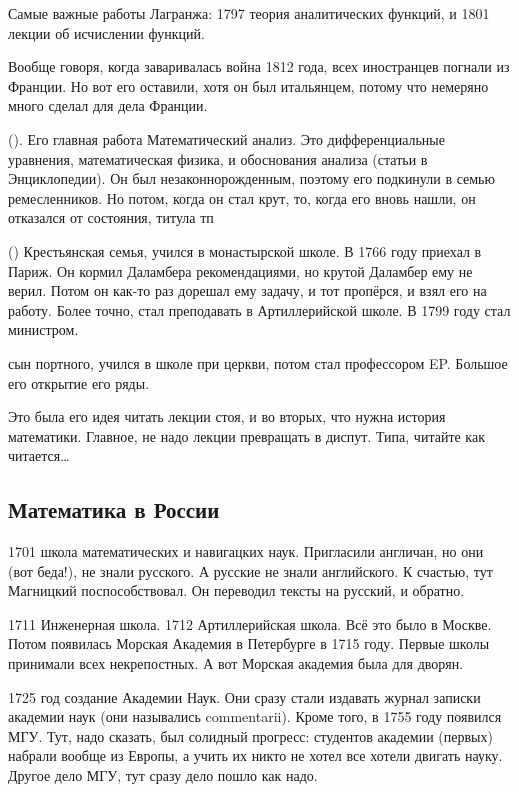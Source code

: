 \documentclass[a4paper,oneside,fleqn,10pt]{article}
\begin{document}
Самые важные работы Лагранжа: 1797 теория аналитических функций, и 1801 лекции об исчислении функций.

Вообще говоря, когда заваривалась война 1812 года, всех иностранцев погнали из Франции.
Но вот его оставили, хотя он был итальянцем, потому что немеряно много сделал для дела Франции.

 (). Его главная работа Математический анализ.
Это дифференциальные уравнения, математическая физика, и обоснования анализа (статьи в Энциклопедии).
Он был незаконнорожденным, поэтому его подкинули в семью ремесленников.
Но потом, когда он стал крут, то, когда его вновь нашли, он отказался от состояния, титула тп

 ()
Крестьянская семья, учился в монастырской школе.
В 1766 году приехал в Париж. Он кормил Даламбера рекомендациями, но крутой Даламбер
ему не верил. Потом он как-то раз дорешал ему задачу, и тот пропёрся, и взял его на работу.
Более точно, стал преподавать в Артиллерийской школе. В 1799 году стал министром.

  сын портного, учился в школе при церкви, потом стал профессором EP.
Большое его открытие его ряды.

Это была его идея читать лекции стоя, и во вторых, что нужна история математики.
Главное, не надо лекции превращать в диспут. Типа, читайте как читается\ldots

\subsection{Математика в России}

1701 школа математических и навигацких наук.
Пригласили англичан, но они (вот беда!), не знали русского. А русские
не знали английского. К счастью, тут Магницкий поспособствовал. Он переводил
тексты на русский, и обратно.

1711 Инженерная школа. 1712 Артиллерийская школа. Всё это было в Москве.
Потом появилась Морская Академия в Петербурге в 1715 году. Первые школы принимали
всех некрепостных. А вот Морская академия была для дворян.

1725 год создание Академии Наук. Они сразу стали издавать журнал записки академии наук (они назывались
commentarii). Кроме того, в 1755 году появился МГУ. Тут, надо сказать, был солидный прогресс: студентов
академии (первых) набрали вообще из Европы, а учить их никто не хотел все хотели двигать науку.
Другое дело МГУ, тут сразу дело пошло как надо.
\end{document}
